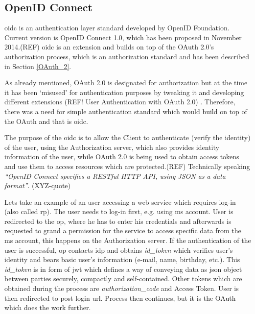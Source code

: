 \subsection{OpenID Connect}

\acrfull{oidc} is an authentication layer standard developed by OpenID Foundation. Current version is OpenID Connect 1.0, which has been proposed in November 2014.(REF) \acrshort{oidc} is an extension and builds on top of the OAuth 2.0’s authorization process, which is an authorization standard and has been described in Section \ref{OAuth_2}. 

As already mentioned, OAuth 2.0 is designated for authorization but at the time it has been ‘misused’ for authentication purposes by tweaking it and developing different extensions (REF! User Authentication with OAuth 2.0) . Therefore, there was a need for simple authentication standard which would build on top of the OAuth and that is \acrshort{oidc}.

The purpose of the \acrshort{oidc} is to allow the Client to authenticate (verify the identity) of the user, using the Authorization server, which also provides identity information of the user, while OAuth 2.0 is being used to obtain access tokens and use them to access resources which are protected.(REF) Technically speaking \textit{“OpenID Connect specifies a RESTful HTTP API, using JSON as a data format”}.  (XYZ-quote)

Lets take an example of an user accessing a web service which requires log-in (also called \acrfull{rp}). The user needs to log-in first, e.g. using \acrfull{ms} account. User is redirected to the \acrfull{op}, where he has to enter his credentials and afterwards is requested to grand a permission for the service to access specific data from the \acrshort{ms} account, this happens on the Authorization server. If the authentication of the user is successful, \acrshort{op} contacts \acrfull{idp} and obtains \textit{id\_token} which verifies user’s identity and bears basic user’s information (e-mail, name, birthday, etc.). This \textit{id\_token} is in form of \acrfull{jwt} which defines a way of conveying data as \acrshort{json} object between parties securely, compactly and self-contained. Other tokens which are obtained during the process are \textit{authorization\_code} and Access Token. User is then redirected to post login \acrshort{url}. Process then continues, but it is the OAuth which does the work further.